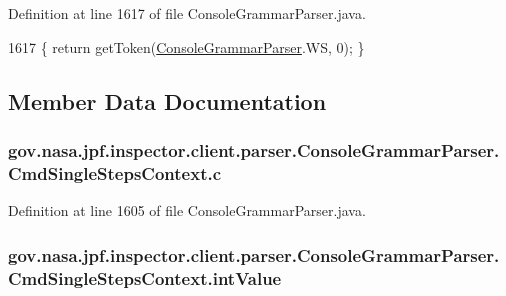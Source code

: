 Definition at line 1617 of file Console\+Grammar\+Parser.\+java.


\begin{DoxyCode}
1617 \{ \textcolor{keywordflow}{return} getToken(\hyperlink{classgov_1_1nasa_1_1jpf_1_1inspector_1_1client_1_1parser_1_1_console_grammar_parser_a03e28f396e991cff9d014f357ae220f3}{ConsoleGrammarParser}.WS, 0); \}
\end{DoxyCode}


\subsection{Member Data Documentation}
\subsubsection[{\texorpdfstring{c}{c}}]{ gov.\+nasa.\+jpf.\+inspector.\+client.\+parser.\+Console\+Grammar\+Parser.\+Cmd\+Single\+Steps\+Context.\+c}\hypertarget{classgov_1_1nasa_1_1jpf_1_1inspector_1_1client_1_1parser_1_1_console_grammar_parser_1_1_cmd_single_steps_context_af6f1fa6a545d472eb9e692313fd9bf07}{}\label{classgov_1_1nasa_1_1jpf_1_1inspector_1_1client_1_1parser_1_1_console_grammar_parser_1_1_cmd_single_steps_context_af6f1fa6a545d472eb9e692313fd9bf07}


Definition at line 1605 of file Console\+Grammar\+Parser.\+java.

\subsubsection[{\texorpdfstring{int\+Value}{intValue}}]{ gov.\+nasa.\+jpf.\+inspector.\+client.\+parser.\+Console\+Grammar\+Parser.\+Cmd\+Single\+Steps\+Context.\+int\+Value}\hypertarget{classgov_1_1nasa_1_1jpf_1_1inspector_1_1client_1_1parser_1_1_console_grammar_parser_1_1_cmd_single_steps_context_a6d9c0d709339223f4a189533ce9ba93a}{}\label{classgov_1_1nasa_1_1jpf_1_1inspector_1_1client_1_1parser_1_1_console_grammar_parser_1_1_cmd_single_steps_context_a6d9c0d709339223f4a189533ce9ba93a}


